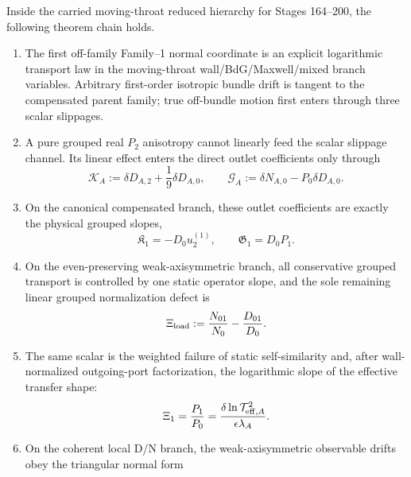 \begin{theorem}
\label{thm:part05-main}
Inside the carried moving-throat reduced hierarchy for Stages 164--200, the following theorem chain holds.
\begin{enumerate}[leftmargin=2.2em]
  \item The first off-family Family--1 normal coordinate is an explicit logarithmic transport law in the moving-throat wall/BdG/Maxwell/mixed branch variables.  Arbitrary first-order isotropic bundle drift is tangent to the compensated parent family; true off-bundle motion first enters through three scalar slippages.
  \item A pure grouped real \(P_2\) anisotropy cannot linearly feed the scalar slippage channel.  Its linear effect enters the direct outlet coefficients only through
  \begin{equation}
  \label{eq:part05-theorem-KG}
  \mathcal K_A:=\delta D_{A,2}+\frac19\delta D_{A,0},
  \qquad
  \mathcal G_A:=\delta N_{A,0}-P_0\delta D_{A,0}.
  \end{equation}
  \item On the canonical compensated branch, these outlet coefficients are exactly the physical grouped slopes,
  \begin{equation}
  \label{eq:part05-theorem-physical-slopes}
  \mathfrak K_1=-D_0u_2^{(1)},
  \qquad
  \mathfrak G_1=D_0P_1.
  \end{equation}
  \item On the even-preserving weak-axisymmetric branch, all conservative grouped transport is controlled by one static operator slope, and the sole remaining linear grouped normalization defect is
  \begin{equation}
  \label{eq:part05-theorem-xiload}
  \Xi_{\rm load}
  :=
  \frac{N_{01}}{N_0}-\frac{D_{01}}{D_0}.
  \end{equation}
  \item The same scalar is the weighted failure of static self-similarity and, after wall-normalized outgoing-port factorization, the logarithmic slope of the effective transfer shape:
  \begin{equation}
  \label{eq:part05-theorem-xi1-transfer}
  \Xi_1
  =
  \frac{P_1}{P_0}
  =
  \frac{\delta\ln\mathcal T_{{\rm eff},A}^{2}}{\epsilon\lambda_A}.
  \end{equation}
  \item On the coherent local D/N branch, the weak-axisymmetric observable drifts obey the triangular normal form

\end{enumerate}
\end{theorem}
